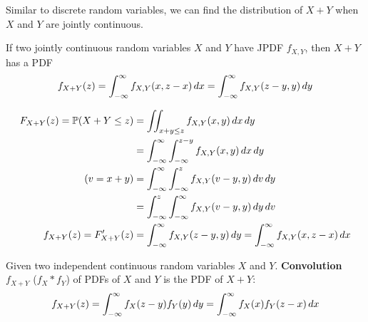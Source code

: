 \documentclass{huhtakm-template-book}
\newcommand{\prob}{\mathbb{P}}
\begin{document}
\newpage
Similar to discrete random variables, we can find the distribution of $X+Y$ when $X$ and $Y$ are jointly continuous.
\begin{thm}
	If two jointly continuous random variables $X$ and $Y$ have JPDF $f_{X,Y}$, then $X+Y$ has a PDF
	\begin{equation*}
		f_{X+Y}(z)=\int_{-\infty}^{\infty} f_{X,Y}(x,z-x)\,dx=\int_{-\infty}^{\infty} f_{X,Y}(z-y,y)\,dy
	\end{equation*}
\end{thm}
\begin{proofing}
	\begin{align*}
		F_{X+Y}(z)=\prob(X+Y\leq z)&=\iint_{x+y\leq z}f_{X,Y}(x,y)\,dx\,dy\\
		&=\intinfty\intlu{-\infty}{z-y}f_{X,Y}(x,y)\,dx\,dy\\
		\tag{$v=x+y$}
		&=\intinfty\intlu{-\infty}{z}f_{X,Y}(v-y,y)\,dv\,dy\\
		&=\intlu{-\infty}{z}\intinfty f_{X,Y}(v-y,y)\,dy\,dv\\
		f_{X+Y}(z)=F_{X+Y}'(z)&=\intinfty f_{X,Y}(z-y,y)\,dy=\intinfty f_{X,Y}(x,z-x)\,dx
	\end{align*}
\end{proofing}
\begin{defn}
	Given two independent continuous random variables $X$ and $Y$. \textbf{Convolution} $f_{X+Y}$ ($f_{X}*f_{Y}$) of PDFs of $X$ and $Y$ is the PDF of $X+Y$:
	\begin{equation*}
		f_{X+Y}(z)=\int_{-\infty}^{\infty} f_{X}(z-y)f_{Y}(y)\,dy=\int_{-\infty}^{\infty} f_{X}(x)f_{Y}(z-x)\,dx
	\end{equation*}
\end{defn}
\end{document}
